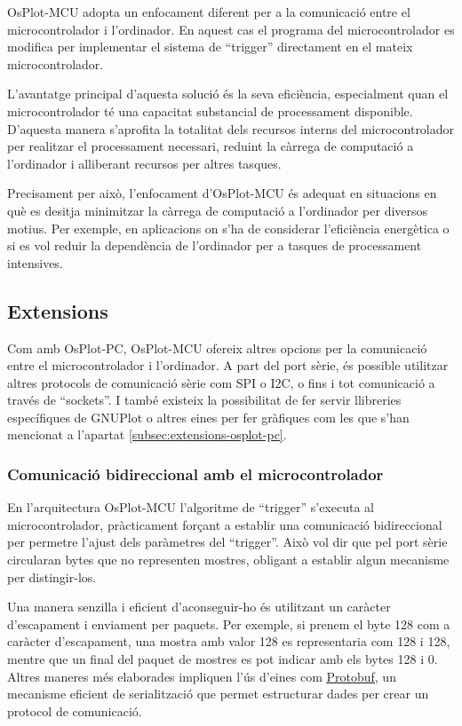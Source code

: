\documentclass{tfgitic}[2023/06/30]
\begin{document}
OsPlot-MCU adopta un enfocament diferent per a la comunicació entre el
microcontrolador i l'ordinador. En aquest cas el programa del
microcontrolador es modifica per implementar el sistema de ``trigger''
directament en el mateix microcontrolador.

\newpage

L'avantatge principal d'aquesta solució és la seva eficiència,
especialment quan el microcontrolador té una capacitat substancial de
processament disponible. D'aquesta manera s'aprofita la totalitat dels
recursos interns del microcontrolador per realitzar el processament
necessari, reduint la càrrega de computació a l'ordinador i alliberant
recursos per altres tasques.

Precisament per això, l'enfocament d'OsPlot-MCU és adequat en
situacions en què es desitja minimitzar la càrrega de computació a
l'ordinador per diversos motius. Per exemple, en aplicacions on s'ha
de considerar l'eficiència energètica o si es vol reduir la
dependència de l'ordinador per a tasques de processament intensives.

\subsection{Extensions}

Com amb OsPlot-PC, OsPlot-MCU ofereix altres opcions per la
comunicació entre el microcontrolador i l'ordinador. A part del port
sèrie, és possible utilitzar altres protocols de comunicació sèrie com
SPI o I2C, o fins i tot comunicació a través de ``sockets''. I també
existeix la possibilitat de fer servir llibreries específiques de
GNUPlot o altres eines per fer gràfiques com les que s'han mencionat a
l'apartat \ref{subsec:extensions-osplot-pc}.

\subsubsection{Comunicació bidireccional amb el microcontrolador}

En l'arquitectura OsPlot-MCU l'algoritme de ``trigger'' s'executa al
microcontrolador, pràcticament forçant a establir una comunicació
bidireccional per permetre l'ajust dels paràmetres del ``trigger''.
Això vol dir que pel port sèrie circularan bytes que no representen
mostres, obligant a establir algun mecanisme per distingir-los.

Una manera senzilla i eficient d'aconseguir-ho és utilitzant un
caràcter d'escapament i enviament per paquets. Per exemple, si prenem
el byte 128 com a caràcter d'escapament, una mostra amb valor 128 es
representaria com 128 i 128, mentre que un final del paquet de mostres
es pot indicar amb els bytes 128 i 0. Altres maneres més elaborades
impliquen l'ús d'eines com
\href{https://protobuf.dev/}{\underline{Protobuf}}, un mecanisme
eficient de serialització que permet estructurar dades per crear un
protocol de comunicació.
\end{document}
